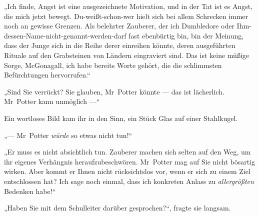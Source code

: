 „Ich finde, Angst ist eine ausgezeichnete Motivation, und in der Tat ist es Angst, die mich jetzt bewegt. Du-weißt-schon-wer hielt sich bei allem Schrecken immer noch an gewisse Grenzen. Als belehrter Zauberer, der ich Dumbledore oder Ihm-dessen-Name-nicht-genannt-werden-darf fast ebenbürtig bin, bin der Meinung, dass der Junge sich in die Reihe derer einreihen könnte, deren ausgeführten Rituale auf den Grabsteinen von Ländern eingraviert sind. Das ist keine müßige Sorge, McGonagall, ich habe bereits Worte gehört, die die schlimmsten Befürchtungen hervorrufen.“

„Sind Sie verrückt? Sie glauben, Mr~Potter könnte — das ist lächerlich. Mr~Potter kann unmöglich —“

Ein wortloses Bild kam ihr in den Sinn, ein Stück Glas auf einer Stahlkugel.

„— Mr~Potter \emph{würde} so etwas nicht tun!“

„Er muss es nicht absichtlich tun. Zauberer machen sich selten auf den Weg, um ihr eigenes Verhängnis heraufzubeschwören. Mr~Potter mag auf Sie nicht bösartig wirken. Aber kommt er Ihnen nicht rücksichtslos vor, wenn er sich zu einem Ziel entschlossen hat? Ich sage noch einmal, dass ich konkreten Anlass zu \emph{allergrößten} Bedenken habe!“

„Haben Sie mit dem Schulleiter darüber gesprochen?“, fragte sie langsam.

